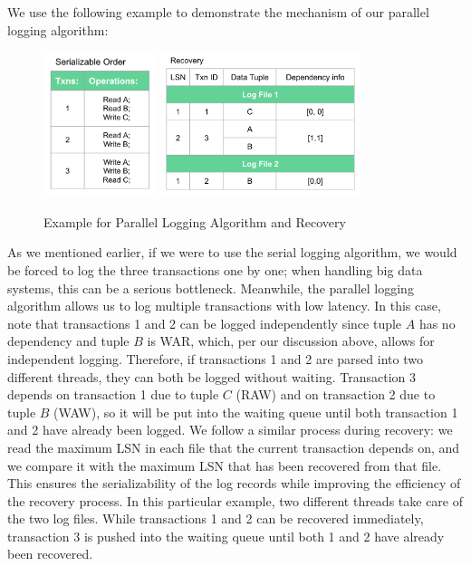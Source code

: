 We use the following example to demonstrate the mechanism of our parallel logging algorithm: 
\begin{figure}[!h]
\caption{Example for Parallel Logging Algorithm and Recovery}
\centering
\includegraphics[height=120pt]{Parallel.png}
\hspace{20pt}
\includegraphics[height=120pt]{Parallel_re.png}
\end{figure}\par
As we mentioned earlier, if we were to use the serial logging algorithm, we would be forced to log the three transactions one by one; when handling big data systems, this can be a serious bottleneck. Meanwhile, the parallel logging algorithm allows us to log multiple transactions with low latency. In this case, note that transactions 1 and 2 can be logged independently since tuple $A$ has no dependency and tuple $B$ is WAR, which, per our discussion above, allows for independent logging. Therefore, if transactions 1 and 2 are parsed into two different threads, they can both be logged without waiting. Transaction 3 depends on transaction 1 due to tuple $C$ (RAW) and on transaction 2 due to tuple $B$ (WAW), so it will be put into the waiting queue until both transaction 1 and 2 have already been logged. 
We follow a similar process during recovery: we read the maximum LSN in each file that the current transaction depends on, and we compare it with the maximum LSN that has been recovered from that file. This ensures the serializability of the log records while improving the efficiency of the recovery process. In this particular example, two different threads take care of the two log files. While transactions 1 and 2 can be recovered immediately, transaction 3 is pushed into the waiting queue until both 1 and 2 have already been recovered.\par
